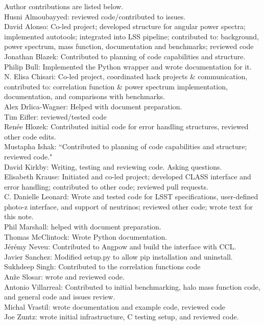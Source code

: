 Author contributions are listed below. \\
Husni Almoubayyed: reviewed code/contributed to issues. \\
David Alonso: Co-led project; developed structure for angular power spectra; implemented autotools; integrated into LSS pipeline; contributed to: background, power spectrum, mass function, documentation and benchmarks; reviewed code \\
Jonathan Blazek: Contributed to planning of code capabilities and structure. \\
Philip Bull: Implemented the Python wrapper and wrote documentation for it. \\
N. Elisa Chisari: Co-led project, coordinated hack projects \& communication, contributed to: correlation function \& power spectrum implementation, documentation, and comparisons with benchmarks. \\
Alex Drlica-Wagner: Helped with document preparation. \\
Tim Eifler: reviewed/tested code \\
Ren\'ee Hlozek: Contributed initial code for error handling structures, reviewed other code edits. \\
Mustapha Ishak: “Contributed to planning of code capabilities and structure; reviewed code." \\
David Kirkby: Writing, testing and reviewing code. Asking questions. \\
Elisabeth Krause: Initiated and co-led project; developed CLASS interface and error handling; contributed to other code; reviewed pull requests. \\
C. Danielle Leonard: Wrote and tested code for LSST specifications, user-defined photo-z interface, and support of neutrinos; reviewed other code; wrote text for this note. \\
Phil Marshall: helped with document preparation. \\
Thomas McClintock: Wrote Python documentation. \\
J\'er\'emy Neveu: Contributed to Angpow and build the interface with CCL. \\
Javier Sanchez: Modified setup.py to allow pip installation and uninstall. \\
Sukhdeep Singh: Contributed to the correlation functions code \\
An\v{z}e Slosar: wrote and reviewed code. \\
Antonio Villarreal: Contributed to initial benchmarking, halo mass function code, and general code and issues review. \\
Michal Vrastil: wrote documentation and example code, reviewed code \\
Joe Zuntz: wrote initial infrastructure, C testing setup, and reviewed code. \\
